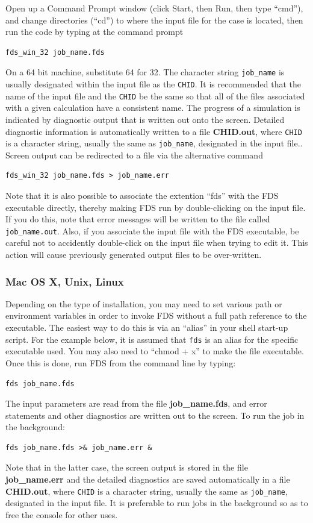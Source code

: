 \documentclass[11pt]{book}
\newcommand{\ct}{\tt\small}
\begin{document}
Open up a Command Prompt window (click Start, then Run, then type ``cmd''), and change directories (``cd'') to where the
input file for the case is located, then run the code by typing at the command prompt
\begin{verbatim}
fds_win_32 job_name.fds
\end{verbatim}
On a 64 bit machine, substitute 64 for 32.
The character string {\ct job\_name} is usually
designated within the input file as the {\ct CHID}. It is recommended that the
name of the input file and the {\ct CHID} be the same so that all of the
files associated with a given calculation have a consistent name.  The progress of a simulation is indicated by diagnostic output that is written
out onto the screen. Detailed diagnostic information is automatically
written to a file {\bf CHID.out}, where {\ct CHID} is a character
string, usually the same as {\ct job\_name}, designated in the input file..
Screen output can be redirected to a file via the alternative command
\begin{verbatim}
fds_win_32 job_name.fds > job_name.err
\end{verbatim}
Note that it is also possible to associate the extention ``fds'' with the FDS executable directly, thereby making FDS run by
double-clicking on the input file. If you do this, note that error messages will be written to the file called {\ct job\_name.out}. Also, if you
associate the input file with the FDS executable, be careful not to accidently double-click on the input file when trying to edit it.
This action will cause previously generated output files to be over-written.



\subsubsection{Mac OS X, Unix, Linux}

Depending on the type of installation, you may need to set various
path or environment variables in order to invoke FDS without a full
path reference to the executable. The easiest way to do this is via
an ``alias'' in your shell start-up script. For the example below,
it is assumed that {\ct fds} is an alias for the specific executable used.
You may also need to ``chmod + x'' to make the file executable.
Once this is done, run FDS from the command line by typing:
\begin{verbatim}
fds job_name.fds
\end{verbatim}
The input parameters are read from the file {\bf job\_name.fds},
and error statements and other diagnostics are written out to the screen.
To run the job in the background:
\begin{verbatim}
fds job_name.fds >& job_name.err &
\end{verbatim}
Note that in the latter case, the screen output is stored in the file
{\bf job\_name.err} and the detailed diagnostics are saved automatically
in a file {\bf CHID.out}, where {\ct CHID} is a character string, usually
the same as {\ct job\_name}, designated in the input file. It is preferable
to run jobs in the background so as to free the console for other uses.
\end{document}
